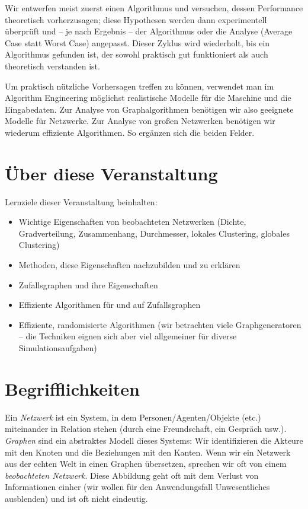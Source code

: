 Wir entwerfen meist zuerst einen Algorithmus und versuchen, dessen Performance theoretisch vorherzusagen;
diese Hypothesen werden dann experimentell überprüft und -- je nach Ergebnis -- der Algorithmus oder die Analyse (\zB Average Case statt Worst Case) angepasst.
Dieser Zyklus wird wiederholt, bis ein Algorithmus gefunden ist, der sowohl praktisch gut funktioniert als auch theoretisch verstanden ist.

Um praktisch nützliche Vorhersagen treffen zu können, verwendet man im Algorithm Engineering möglichst realistische Modelle für die Maschine und die Eingabedaten.
Zur Analyse von Graphalgorithmen benötigen wir also geeignete Modelle für Netzwerke.
Zur Analyse von großen Netzwerken benötigen wir wiederum effiziente Algorithmen.
So ergänzen sich die beiden Felder.

\section{Über diese Veranstaltung}
Lernziele dieser Veranstaltung beinhalten:
\begin{itemize}
    \item Wichtige Eigenschaften von beobachteten Netzwerken (\zB Dichte, Gradverteilung, Zusammenhang, Durchmesser, lokales Clustering, globales Clustering)
    \item Methoden, diese Eigenschaften nachzubilden und zu erklären
    \item Zufallsgraphen und ihre Eigenschaften
    \item Effiziente Algorithmen für und auf Zufallsgraphen
    \item Effiziente, randomisierte Algorithmen (wir betrachten viele Graphgeneratoren -- die Techniken eignen sich aber viel allgemeiner für diverse Simulationsaufgaben)
\end{itemize}

\section{Begrifflichkeiten}
Ein \emph{Netzwerk} ist ein System, in dem Personen/Agenten/Objekte (etc.) miteinander in Relation stehen (\zB durch eine Freundschaft, ein Gespräch usw.).
\emph{Graphen} sind ein abstraktes Modell dieses Systems: Wir identifizieren die Akteure mit den Knoten und die Beziehungen mit den Kanten.
Wenn wir ein Netzwerk aus der echten Welt in einen Graphen übersetzen, sprechen wir oft von einem \emph{beobachteten Netzwerk}.
Diese Abbildung geht oft mit dem Verlust von Informationen einher (wir wollen für den Anwendungsfall Unwesentliches ausblenden) und ist oft nicht eindeutig.

